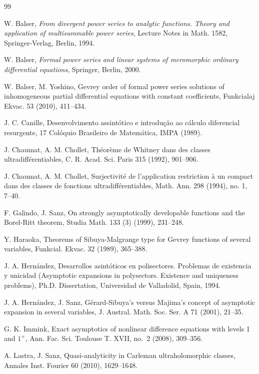 \documentclass[11pt,a4paper,leqno]{article}
\theoremstyle{plain}
\theoremstyle{definition}
\begin{document}
\begin{thebibliography}{99}

 W. Balser,
{\it From divergent power series to analytic functions. Theory and application of multisummable power series}, Lecture Notes in Math.
1582, Springer-Verlag, Berlin, 1994.

 W. Balser, \textit{Formal power series and linear systems of meromorphic ordinary differential equations}, Springer, Berlin, 2000.

 W. Balser, M. Yoshino, Gevrey order of formal power series solutions of inhomogeneous partial differential equations with constant coefficients, Funkcialaj Ekvac. 53 (2010), 411--434.

 J. C. Canille, Desenvolvimento assint\'otico e introdu\c{c}\~ao ao c\'alculo diferencial resurgente, 17 Col\'oquio Brasileiro de Matem\'atica, IMPA (1989).

 J. Chaumat, A. M. Chollet,
Th\'eor\`eme de Whitney dans des classes ultradiff\'erentiables, C. R. Acad. Sci. Paris 315 (1992), 901--906.

 J. Chaumat, A. M. Chollet, Surjectivit\'e de l'application restriction \`a un compact dans des classes de fonctions ultradiff\'erentiables, Math. Ann. 298 (1994), no. 1, 7--40.

 F. Galindo, J. Sanz, On strongly asymptotically developable functions and the Borel-Ritt theorem, Studia Math. 133 (3) (1999), 231--248.

 Y. Haraoka,
Theorems of Sibuya-Malgrange type for Gevrey functions of several
variables, Funkcial. Ekvac. 32 (1989), 365--388.

 J. A. Hern\'andez, Desarrollos asint\'oticos en polisectores. Problemas de existencia y unicidad (Asymptotic expansions in polysectors. Existence and uniqueness
problems), Ph.D. Dissertation, Universidad de Valladolid, Spain, 1994.

 J. A. Hern\'andez, J. Sanz, G\'erard-Sibuya's versus Majima's concept of asymptotic expansion in several variables, J. Austral. Math. Soc. Ser. A 71 (2001), 21--35.

 G. K. Immink, Exact asymptotics of nonlinear difference equations with levels 1 and $1^+$, Ann. Fac. Sci. Toulouse T. XVII, no.\ 2 (2008), 309--356.

 A. Lastra, J. Sanz, Quasi-analyticity in Carleman ultraholomorphic classes, Annales Inst. Fourier 60 (2010), 1629--1648.


\end{thebibliography}
\end{document}
